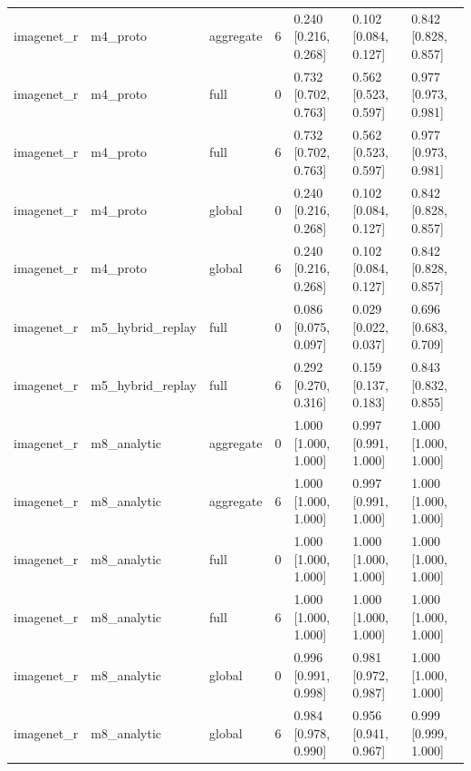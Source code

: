 \begin{tabular}{lllrlll}
imagenet\_r & m4\_proto & aggregate & 6 & 0.240 [0.216, 0.268] & 0.102 [0.084, 0.127] & 0.842 [0.828, 0.857] \\
imagenet\_r & m4\_proto & full & 0 & 0.732 [0.702, 0.763] & 0.562 [0.523, 0.597] & 0.977 [0.973, 0.981] \\
imagenet\_r & m4\_proto & full & 6 & 0.732 [0.702, 0.763] & 0.562 [0.523, 0.597] & 0.977 [0.973, 0.981] \\
imagenet\_r & m4\_proto & global & 0 & 0.240 [0.216, 0.268] & 0.102 [0.084, 0.127] & 0.842 [0.828, 0.857] \\
imagenet\_r & m4\_proto & global & 6 & 0.240 [0.216, 0.268] & 0.102 [0.084, 0.127] & 0.842 [0.828, 0.857] \\
imagenet\_r & m5\_hybrid\_replay & full & 0 & 0.086 [0.075, 0.097] & 0.029 [0.022, 0.037] & 0.696 [0.683, 0.709] \\
imagenet\_r & m5\_hybrid\_replay & full & 6 & 0.292 [0.270, 0.316] & 0.159 [0.137, 0.183] & 0.843 [0.832, 0.855] \\
imagenet\_r & m8\_analytic & aggregate & 0 & 1.000 [1.000, 1.000] & 0.997 [0.991, 1.000] & 1.000 [1.000, 1.000] \\
imagenet\_r & m8\_analytic & aggregate & 6 & 1.000 [1.000, 1.000] & 0.997 [0.991, 1.000] & 1.000 [1.000, 1.000] \\
imagenet\_r & m8\_analytic & full & 0 & 1.000 [1.000, 1.000] & 1.000 [1.000, 1.000] & 1.000 [1.000, 1.000] \\
imagenet\_r & m8\_analytic & full & 6 & 1.000 [1.000, 1.000] & 1.000 [1.000, 1.000] & 1.000 [1.000, 1.000] \\
imagenet\_r & m8\_analytic & global & 0 & 0.996 [0.991, 0.998] & 0.981 [0.972, 0.987] & 1.000 [1.000, 1.000] \\
imagenet\_r & m8\_analytic & global & 6 & 0.984 [0.978, 0.990] & 0.956 [0.941, 0.967] & 0.999 [0.999, 1.000] \\
\bottomrule
\end{tabular}
